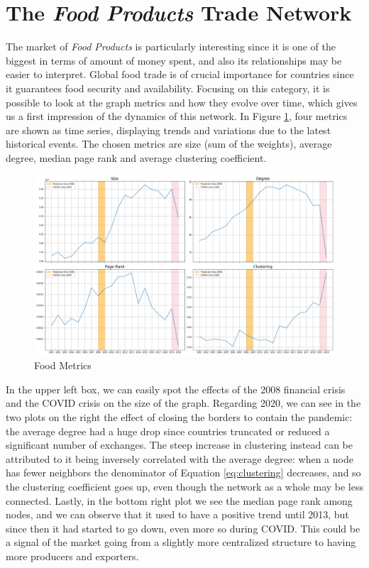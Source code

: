 \section{The \textit{Food Products} Trade Network}

The market of \textit{Food Products} is particularly interesting since it is one of the biggest in terms of amount of money spent, and also its relationships may be easier to interpret. Global food trade is of crucial importance for countries since it guarantees food security and availability. Focusing on this category, it is possible to look at the graph metrics and how they evolve over time, which gives us a first impression of the dynamics of this network. In Figure \ref{fig:foodmetrics}, four metrics are shown as time series, displaying trends and variations due to the latest historical events. The chosen metrics are size (sum of the weights), average degree, median page rank and average clustering coefficient.

\begin{figure}
    \centering
    \includegraphics[width=\textwidth]{tex/pics/full_p10_metric_ts.png}
    \caption{Food Metrics}
    \label{fig:foodmetrics}
\end{figure}

In the upper left box, we can easily spot the effects of the 2008 financial crisis and the COVID crisis on the size of the graph. 
Regarding 2020, we can see in the two plots on the right the effect of closing the borders to contain the pandemic: the average degree had a huge drop since countries truncated or reduced a significant number of exchanges. The steep increase in clustering instead can be attributed to it being inversely correlated with the average degree: when a node has fewer neighbors the denominator of Equation \ref{eq:clustering} decreases, and so the clustering coefficient goes up, even though the network as a whole may be less connected. 
Lastly, in the bottom right plot we see the median page rank among nodes, and we can observe that it used to have a positive trend until 2013, but since then it had started to go down, even more so during COVID. This could be a signal of the market going from a slightly more centralized structure to having more producers and exporters.

